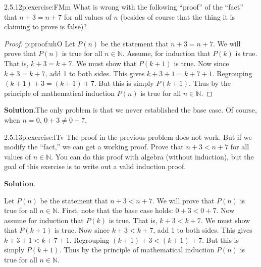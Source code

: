 \documentclass[twoside,11pt,]{book}
\newcommand{\blocktitlefont}{\relax}
\numberwithin{equation}{chapter}
\newcommand{\N}{\mathbb N}
\newcommand{\lt}{<}
\begin{document}
\begin{divisionsolution}{2.5.12}{}{p:exercise:FMm}%
What is wrong with the following ``proof'' of the ``fact'' that \(n+3 = n+7\) for all values of \(n\) (besides of course that the thing it is claiming to prove is false)?%
\begin{proof}{}{p:proof:uhO}
Let \(P(n)\) be the statement that \(n + 3 = n + 7\). We will prove that \(P(n)\) is true for all \(n \in \N\). Assume, for induction that \(P(k)\) is true. That is, \(k+3 = k+7\). We must show that \(P(k+1)\) is true. Now since \(k + 3 = k + 7\), add 1 to both sides. This gives \(k + 3 + 1 = k + 7 + 1\). Regrouping \((k+1) + 3 = (k+1) + 7\). But this is simply \(P(k+1)\). Thus by the principle of mathematical induction \(P(n)\) is true for all \(n \in \N\).%
\end{proof}
\par\smallskip%
\noindent\textbf{\blocktitlefont Solution}.\quad{}The only problem is that we never established the base case. Of course, when \(n = 0\), \(0+3 \ne 0+7\).%
\end{divisionsolution}%
\begin{divisionsolution}{2.5.13}{}{p:exercise:lTv}%
The proof in the previous problem does not work. But if we modify the ``fact,'' we can get a working proof. Prove that \(n + 3 \lt n + 7\) for all values of \(n \in \N\). You can do this proof with algebra (without induction), but the goal of this exercise is to write out a valid induction proof.%
\par\smallskip%
\noindent\textbf{\blocktitlefont Solution}.\quad{}\begin{solutionproof}
Let \(P(n)\) be the statement that \(n + 3 \lt n + 7\). We will prove that \(P(n)\) is true for all \(n \in \N\). First, note that the base case holds: \(0+3 \lt 0+7\). Now assume for induction that \(P(k)\) is true. That is, \(k+3 \lt k+7\). We must show that \(P(k+1)\) is true. Now since \(k + 3 \lt k + 7\), add 1 to both sides. This gives \(k + 3 + 1 \lt k + 7 + 1\). Regrouping \((k+1) + 3 \lt (k+1) + 7\). But this is simply \(P(k+1)\). Thus by the principle of mathematical induction \(P(n)\) is true for all \(n \in \N\).%
\end{solutionproof}
\end{divisionsolution}%
\end{document}
